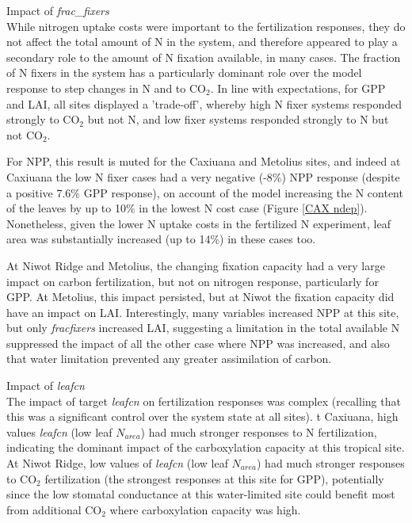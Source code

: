 \documentclass[draft,linenumbers]{agujournal}
\begin{document}
Impact of \emph{frac\_fixers}\\
While nitrogen uptake costs were important to the fertilization responses, they do not affect the total amount of N in the system, and therefore appeared to play a secondary role to the amount of N fixation available, in many cases.  The fraction of N fixers in the system has a particularly dominant role over the model response to step changes in N and to CO$_{2}$. In line with expectations, for GPP and LAI, all sites displayed a 'trade-off', whereby high N fixer systems responded strongly to CO$_{2}$ but not N, and low fixer systems responded strongly to N but not CO$_{2}$. 

For NPP, this result is muted for the Caxiuana and Metolius sites, and indeed at Caxiuana the low N fixer cases had a very negative (-8\%) NPP response (despite a positive 7.6\% GPP response), on account of the model increasing the N content of the leaves by up to 10\% in the lowest N cost case (Figure \ref{CAX ndep}). Nonetheless, given the lower N uptake costs in the fertilized N experiment, leaf area was substantially increased (up to 14\%) in these cases too. 

At Niwot Ridge and Metolius, the changing fixation capacity had a very large impact on carbon fertilization, but not on nitrogen response, particularly for GPP. At Metolius, this impact persisted, but at Niwot the fixation capacity did have an impact on LAI. Interestingly, many variables increased NPP at this site, but only \emph{fracfixers} increased LAI, suggesting a limitation in the total available N suppressed the impact of all the other case where NPP was increased, and also that water limitation prevented any greater assimilation of carbon. 


Impact of \emph{leafcn}\\
The impact of target \emph{leafcn} on fertilization responses was complex (recalling that this was a significant control over the system state at all sites). t Caxiuana, high values \emph{leafcn} (low leaf  $N_{area}$) had much stronger responses to N fertilization, indicating the dominant impact of the carboxylation capacity at this tropical site.  At Niwot Ridge, low values of \emph{leafcn} (low leaf  $N_{area}$) had much stronger responses to CO$_{2}$ fertilization (the strongest responses at this site for GPP), potentially since the low stomatal conductance at this water-limited site could benefit most from additional CO$_{2}$ where carboxylation capacity was high. 
\end{document}
